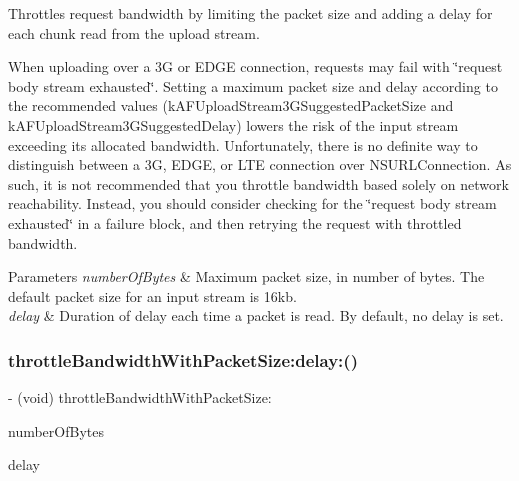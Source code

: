 Throttles request bandwidth by limiting the packet size and adding a delay for each chunk read from the upload stream.

When uploading over a 3G or E\+D\+GE connection, requests may fail with \char`\"{}request body stream exhausted\char`\"{}. Setting a maximum packet size and delay according to the recommended values ({\ttfamily k\+A\+F\+Upload\+Stream3\+G\+Suggested\+Packet\+Size} and {\ttfamily k\+A\+F\+Upload\+Stream3\+G\+Suggested\+Delay}) lowers the risk of the input stream exceeding its allocated bandwidth. Unfortunately, there is no definite way to distinguish between a 3G, E\+D\+GE, or L\+TE connection over {\ttfamily N\+S\+U\+R\+L\+Connection}. As such, it is not recommended that you throttle bandwidth based solely on network reachability. Instead, you should consider checking for the \char`\"{}request body stream exhausted\char`\"{} in a failure block, and then retrying the request with throttled bandwidth.


\begin{DoxyParams}{Parameters}
{\em number\+Of\+Bytes} & Maximum packet size, in number of bytes. The default packet size for an input stream is 16kb. \\
\hline
{\em delay} & Duration of delay each time a packet is read. By default, no delay is set. \\
\hline
\end{DoxyParams}
\mbox{\label{protocol_a_f_multipart_form_data-p_a6c60c3d0ab6d679fe548106efc147708}} 
\subsubsection{\texorpdfstring{throttle\+Bandwidth\+With\+Packet\+Size\+:delay\+:()}{throttleBandwidthWithPacketSize:delay:()}\hspace{0.1cm}{\footnotesize\ttfamily [3/3]}}
{\footnotesize\ttfamily -\/ (void) throttle\+Bandwidth\+With\+Packet\+Size\+: \begin{DoxyParamCaption}\item[{(N\+S\+U\+Integer)}]{number\+Of\+Bytes }\item[{delay:(N\+S\+Time\+Interval)}]{delay }\end{DoxyParamCaption}}


